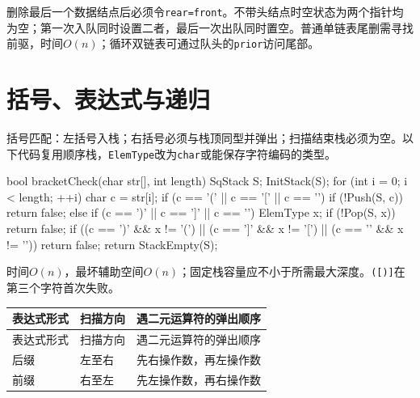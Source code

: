 删除最后一个数据结点后必须令\texttt{rear=\allowbreak{}front}。不带头结点时空状态为两个指针均为空；第一次入队同时设置二者，最后一次出队同时置空。普通单链表尾删需寻找前驱，时间\(O(n)\)；循环双链表可通过队头的\texttt{prior}访问尾部。

\section{括号、表达式与递归}\label{DS03-applications}

括号匹配：左括号入栈；右括号必须与栈顶同型并弹出；扫描结束栈必须为空。以下代码复用顺序栈，\texttt{ElemType}改为\texttt{char}或能保存字符编码的类型。

\par\smallskip\noindent\begin{minipage}{\linewidth}
\begin{codeblock}[language={C++}]
bool bracketCheck(char str[], int length) {
    SqStack S;
    InitStack(S);
    for (int i = 0; i < length; ++i) {
        char c = str[i];
        if (c == '(' || c == '[' || c == '{') {
            if (!Push(S, c)) return false;
        } else if (c == ')' || c == ']' || c == '}') {
            ElemType x;
            if (!Pop(S, x)) return false;
            if ((c == ')' && x != '(') ||
                (c == ']' && x != '[') ||
                (c == '}' && x != '{')) return false;
        }
    }
    return StackEmpty(S);
}
\end{codeblock}
\end{minipage}\par\smallskip

时间\(O(n)\)，最坏辅助空间\(O(n)\)；固定栈容量应不小于所需最大深度。\texttt{(\allowbreak{}[\allowbreak{})\allowbreak{}]\allowbreak{}}在第三个字符首次失败。

\par\smallskip
{\fontsize{9.3}{12}\selectfont\setlength{\tabcolsep}{2.5pt}\setlength{\LTleft}{0pt}\setlength{\LTright}{0pt}
\begin{longtable}{@{}>{\raggedright\arraybackslash}p{}>{\raggedright\arraybackslash}p{}>{\raggedright\arraybackslash}p{}@{}}
\toprule
表达式形式 & 扫描方向 & 遇二元运算符的弹出顺序 \\

\midrule\endfirsthead\toprule
表达式形式 & 扫描方向 & 遇二元运算符的弹出顺序 \\

\midrule\endhead\bottomrule\endfoot
后缀 & 左至右 & 先右操作数，再左操作数 \\

前缀 & 右至左 & 先左操作数，再右操作数 \\

\end{longtable}}
\par\smallskip

